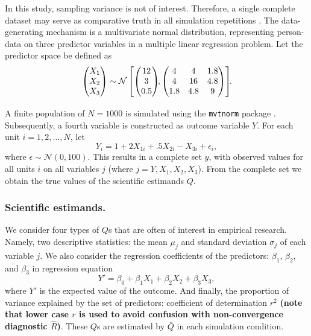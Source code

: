 \documentclass[Royal,times,sageh]{sagej}
\begin{document}
In this study, sampling variance is not of interest. Therefore, a single complete dataset may serve as comparative truth in all simulation repetitions \citep{vink14}. The data-generating mechanism is a multivariate normal distribution, representing person-data on three predictor variables in a multiple linear regression problem. Let the predictor space be defined as
\[
\begin{aligned}
\begin{pmatrix}X_1\\
X_2\\
X_3
\end{pmatrix} \sim \mathcal{N}
\begin{bmatrix}
\begin{pmatrix}
12\\
3\\
0.5
\end{pmatrix}\!\!,
\begin{pmatrix}
4 & 4 & 1.8 \\
4 & 16 & 4.8\\
1.8 & 4.8 & 9
\end{pmatrix}
\end{bmatrix}\!\!\text{.}\\[2\jot]
\end{aligned}
\]
A finite population of \(N=1000\) is simulated using the \texttt{mvtnorm} package \citep{mvtnorm}. Subsequently, a fourth variable is constructed as outcome variable \(Y\). For each unit \(i = 1, 2,..., N\), let
\[
Y_i = 1 + 2X_{1i} +.5X_{2i} - X_{3i} + \epsilon_i ,
\]
where \(\epsilon \sim \mathcal{N}(0, 100)\). This results in a complete set \(y\), with observed values for all units \(i\) on all variables \(j\) (where \(j = Y, X_1, X_2, X_3\)). From the complete set we obtain the true values of the scientific estimands \(Q\).

\hypertarget{scientific-estimands.}{%
\subsubsection{Scientific estimands.}\label{scientific-estimands.}}

We consider four types of \(Q\)s that are often of interest in empirical research. Namely, two descriptive statistics: the mean \(\mu_j\) and standard deviation \(\sigma_j\) of each variable \(j\). We also consider the regression coefficients of the predictors: \(\beta_1\), \(\beta_2\), and \(\beta_3\) in regression equation
\[Y' = \beta_0 + \beta_1 X_1 + \beta_2 X_2 + \beta_3 X_3,\]
where \(Y'\) is the expected value of the outcome. And finally, the proportion of variance explained by the set of predictors: coefficient of determination \(r^2\) \textbf{(note that lower case \(r\) is used to avoid confusion with non-convergence diagnostic \(\widehat{R}\))}. These \(Q\)s are estimated by \(\bar{Q}\) in each simulation condition.
\end{document}
